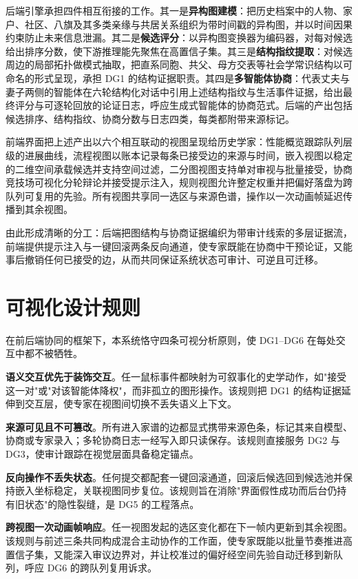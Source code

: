 后端引擎承担四件相互衔接的工作。其一是\textbf{异构图建模}：把历史档案中的人物、家户、社区、八旗及其多类亲缘与共居关系组织为带时间戳的异构图，并以时间因果约束防止未来信息泄漏。其二是\textbf{候选评分}：以异构图变换器为编码器，对每对候选给出排序分数，使下游推理能先聚焦在高置信子集。其三是\textbf{结构指纹提取}：对候选周边的局部拓扑做模式抽取，把直系同胞、共父、母方交表等社会学常识结构以可命名的形式呈现，承担 DG1 的结构证据职责。其四是\textbf{多智能体协商}：代表丈夫与妻子两侧的智能体在六轮结构化对话中引用上述结构指纹与生活事件证据，给出最终评分与可逐轮回放的论证日志，呼应生成式智能体的协商范式\citep{park2023generative}。后端的产出包括候选排序、结构指纹、协商分数与日志四类，每类都附带来源标记。

前端界面把上述产出以六个相互联动的视图呈现给历史学家：性能概览跟踪队列层级的进展曲线，流程视图以账本记录每条已接受边的来源与时间，嵌入视图以稳定的二维空间承载候选并支持空间过滤，二分图视图支持单对审视与批量接受，协商竞技场可视化分轮辩论并接受提示注入，规则视图允许整定权重并把偏好落盘为跨队列可复用的先验。所有视图共享同一选区与来源色谱，操作以一次动画帧延迟传播到其余视图。

由此形成清晰的分工：后端把图结构与协商证据编织为带审计线索的多层证据流，前端提供提示注入与一键回滚两条反向通道，使专家既能在协商中干预论证，又能事后撤销任何已接受的边，从而共同保证系统状态可审计、可逆且可迁移。

\section{可视化设计规则}\label{sec:overview-vis-rules}

在前后端协同的框架下，本系统恪守四条可视分析原则，使 DG1--DG6 在每处交互中都不被牺牲。

\textbf{语义交互优先于装饰交互}。任一鼠标事件都映射为可叙事化的史学动作，如"接受这一对"或"对该智能体降权"，而非孤立的图形操作\citep{endert2017state}。该规则把 DG1 的结构证据延伸到交互层，使专家在视图间切换不丢失语义上下文。

\textbf{来源可见且不可篡改}。所有进入家谱的边都显式携带来源色条，标记其来自模型、协商或专家录入；多轮协商日志一经写入即只读保存。该规则直接服务 DG2 与 DG3，使审计跟踪在视觉层面具备稳定锚点。

\textbf{反向操作不丢失状态}。任何提交都配套一键回滚通道，回滚后候选回到候选池并保持嵌入坐标稳定，关联视图同步复位。该规则旨在消除"界面假性成功而后台仍持有旧状态"的隐性裂缝，是 DG5 的工程落点。

\textbf{跨视图一次动画帧响应}。任一视图发起的选区变化都在下一帧内更新到其余视图。该规则与前述三条共同构成混合主动协作的工作面，使专家既能以批量节奏推进高置信子集，又能深入审议边界对，并让校准过的偏好经空间先验自动迁移到新队列，呼应 DG6 的跨队列复用诉求。
